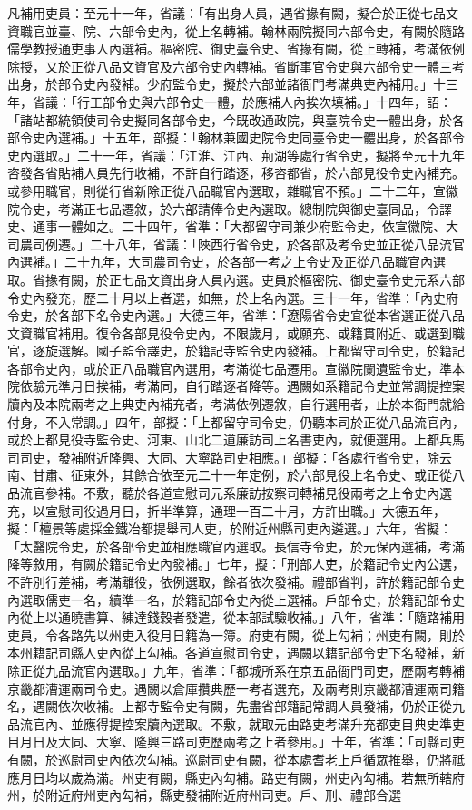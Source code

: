 \begin{pinyinscope}
 凡補用吏員：至元十一年，省議：「有出身人員，遇省掾有闕，擬合於正從七品文資職官並臺、院、六部令史內，從上名轉補。翰林兩院擬同六部令史，有闕於隨路儒學教授通吏事人內選補。樞密院、御史臺令史、省掾有闕，從上轉補，考滿依例除授，又於正從八品文資官及六部令史內轉補。省斷事官令史與六部令史一體三考出身，於部令史內發補。少府監令史，擬於六部並諸衙門考滿典吏內補用。」十三年，省議：「行工部令史與六部令史一體，於應補人內挨次填補。」十四年，詔：「諸站都統領使司令史擬同各部令史，今既改通政院，與臺院令史一體出身，於各部令史內選補。」十五年，部擬：「翰林兼國史院令史同臺令史一體出身，於各部令史內選取。」二十一年，省議：「江淮、江西、荊湖等處行省令史，擬將至元十九年咨發各省貼補人員先行收補，不許自行踏逐，移咨都省，於六部見役令史內補充。或參用職官，則從行省新除正從八品職官內選取，雜職官不預。」二十二年，宣徽院令史，考滿正七品遷敘，於六部請俸令史內選取。總制院與御史臺同品，令譯史、通事一體如之。二十四年，省準：「大都留守司兼少府監令史，依宣徽院、大司農司例遷。」二十八年，省議：「陜西行省令史，於各部及考令史並正從八品流官內選補。」二十九年，大司農司令史，於各部一考之上令史及正從八品職官內選取。省掾有闕，於正七品文資出身人員內選。吏員於樞密院、御史臺令史元系六部令史內發充，歷二十月以上者選，如無，於上名內選。三十一年，省準：「內史府令史，於各部下名令史內選。」大德三年，省準：「遼陽省令史宜從本省選正從八品文資職官補用。復令各部見役令史內，不限歲月，或願充、或籍貫附近、或選到職官，逐旋選解。國子監令譯史，於籍記寺監令史內發補。上都留守司令史，於籍記各部令史內，或於正八品職官內選用，考滿從七品遷用。宣徽院闌遺監令史，準本院依驗元準月日挨補，考滿同，自行踏逐者降等。遇闕如系籍記令史並常調提控案牘內及本院兩考之上典吏內補充者，考滿依例遷敘，自行選用者，止於本衙門就給付身，不入常調。」四年，部擬：「上都留守司令史，仍聽本司於正從八品流官內，或於上都見役寺監令史、河東、山北二道廉訪司上名書吏內，就便選用。上都兵馬司司吏，發補附近隆興、大同、大寧路司吏相應。」部擬：「各處行省令史，除云南、甘肅、征東外，其餘合依至元二十一年定例，於六部見役上名令史、或正從八品流官參補。不敷，聽於各道宣慰司元系廉訪按察司轉補見役兩考之上令史內選充，以宣慰司役過月日，折半準算，通理一百二十月，方許出職。」大德五年，擬：「檀景等處採金鐵冶都提舉司人吏，於附近州縣司吏內遴選。」六年，省擬：「太醫院令史，於各部令史並相應職官內選取。長信寺令史，於元保內選補，考滿降等敘用，有闕於籍記令史內發補。」七年，擬：「刑部人吏，於籍記令史內公選，不許別行差補，考滿離役，依例選取，餘者依次發補。禮部省判，許於籍記部令史內選取儒吏一名，續準一名，於籍記部令史內從上選補。戶部令史，於籍記部令史內從上以通曉書算、練達錢穀者發遣，從本部試驗收補。」八年，省準：「隨路補用吏員，令各路先以州吏入役月日籍為一簿。府吏有闕，從上勾補；州吏有闕，則於本州籍記司縣人吏內從上勾補。各道宣慰司令史，遇闕以籍記部令史下名發補，新除正從九品流官內選取。」九年，省準：「都城所系在京五品衙門司吏，歷兩考轉補京畿都漕運兩司令史。遇闕以倉庫攢典歷一考者選充，及兩考則京畿都漕運兩司籍名，遇闕依次收補。上都寺監令史有闕，先盡省部籍記常調人員發補，仍於正從九品流官內、並應得提控案牘內選取。不敷，就取元由路吏考滿升充都吏目典史準吏目月日及大同、大寧、隆興三路司吏歷兩考之上者參用。」十年，省準：「司縣司吏有闕，於巡尉司吏內依次勾補。巡尉司吏有闕，從本處耆老上戶循眾推舉，仍將祗應月日均以歲為滿。州吏有闕，縣吏內勾補。路吏有闕，州吏內勾補。若無所轄府州，於附近府州吏內勾補，縣吏發補附近府州司吏。戶、刑、禮部合選
\end{pinyinscope}
